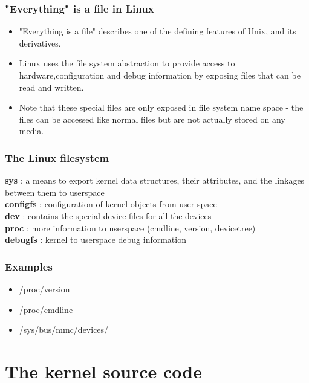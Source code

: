 \documentclass{beamer}
\begin{document}
\begin{frame}
\frametitle{"Everything" is a file in Linux}
\begin{itemize}
	\item "Everything is a file" describes one of the defining features of Unix, and its derivatives.

	\item Linux uses the file system abstraction to provide access to hardware,configuration and debug information by exposing files that can be read and written.
	\item Note that these special files are only exposed in file system name space - the files can be accessed like normal files but are not actually stored on any media.
\end{itemize}
\end{frame}

\begin{frame}
\frametitle{The Linux filesystem}
\textbf{sys}  : a means to export kernel data structures, their attributes, and the 
linkages between them to userspace \\
\textbf{configfs} : configuration of kernel objects from user space \\
\textbf{dev} : contains the special device files for all the devices \\
\textbf{proc} : more information to userspace (cmdline, version, devicetree) \\
\textbf{debugfs} : kernel to userspace debug information \\
\end{frame}

\begin{frame}
\frametitle{Examples}
\begin{itemize}
	\item /proc/version
	\item /proc/cmdline
	\item /sys/bus/mmc/devices/
\end{itemize}
\end{frame}

\section{The kernel source code}
\end{document}
